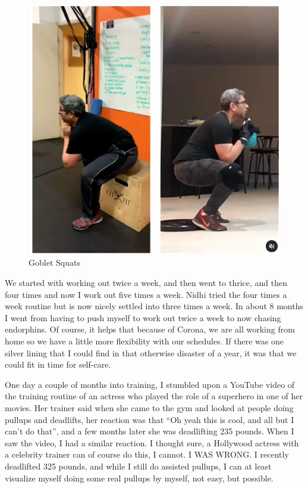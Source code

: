 \documentclass[
  oneside]{book}
\begin{document}
\begin{figure}
\centering
\includegraphics{pictures/goblet_squat_w_kb.png}
\caption{Goblet Squats}
\end{figure}

We started with working out twice a week, and then went to thrice, and then four times and now I work out five times a week. Nidhi tried the four times a week routine but is now nicely settled into three times a week. In about 8 months I went from having to push myself to work out twice a week to now chasing endorphins. Of course, it helps that because of Corona, we are all working from home so we have a little more flexibility with our schedules. If there was one silver lining that I could find in that otherwise disaster of a year, it was that we could fit in time for self-care.

One day a couple of months into training, I stumbled upon a YouTube video of the training routine of an actress who played the role of a superhero in one of her movies. Her trainer said when she came to the gym and looked at people doing pullups and deadlifts, her reaction was that ``Oh yeah this is cool, and all but I can't do that'', and a few months later she was deadlifting 235 pounds. When I saw the video, I had a similar reaction. I thought sure, a Hollywood actress with a celebrity trainer can of course do this, I cannot. I WAS WRONG. I recently deadlifted 325 pounds, and while I still do assisted pullups, I can at least visualize myself doing some real pullups by myself, not easy, but possible.
\end{document}
